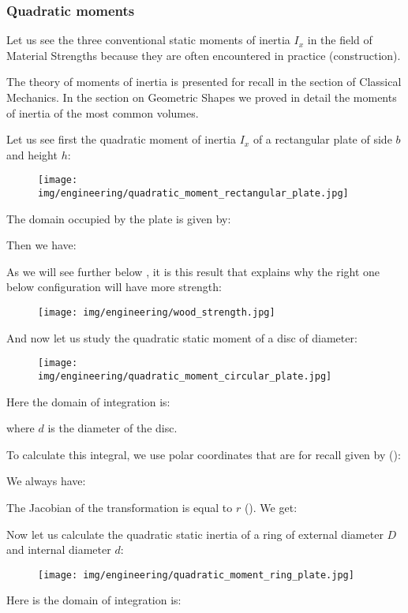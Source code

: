 	\pagebreak
	\subsubsection{Quadratic moments}
	Let us see the three conventional static moments of inertia $I_x$ in the field of Material Strengths because they are often encountered in practice (construction).
	
	\begin{tcolorbox}[title=Remark,colframe=black,arc=10pt]
	The theory of moments of inertia is presented for recall in the section of Classical Mechanics. In the section on Geometric Shapes we proved in detail the moments of inertia of the most common volumes.
	\end{tcolorbox}
	Let us see first the quadratic moment of inertia $I_x$ of a  rectangular plate of side $b$ and height $h$:
	\begin{figure}[H]
		\centering
		\texttt{[image: img/engineering/quadratic\_moment\_rectangular\_plate.jpg]}
	\end{figure}
	The domain occupied by the plate is given by:
	
	Then we have:
	
	As we will see further below , it is this result that explains why the right one below configuration will have more strength:
	\begin{figure}[H]
		\centering
		\texttt{[image: img/engineering/wood\_strength.jpg]}
	\end{figure}
	\pagebreak
	And now let us study the quadratic static moment of a disc of diameter:
	\begin{figure}[H]
		\centering
		\texttt{[image: img/engineering/quadratic\_moment\_circular\_plate.jpg]}
	\end{figure}
	Here the domain of integration is:
	
	where $d$ is the diameter of the disc.
	
	To calculate this integral, we use polar coordinates that are for recall given by ():
	
	
	We always have:
	
	
	The Jacobian of the transformation is equal to $r$ (). We get:
	
	
	Now let us calculate the quadratic static inertia of a ring of external diameter $D$ and internal diameter $d$:
	\begin{figure}[H]
		\centering
		\texttt{[image: img/engineering/quadratic\_moment\_ring\_plate.jpg]}
	\end{figure}
	Here is the domain of integration is:
	
